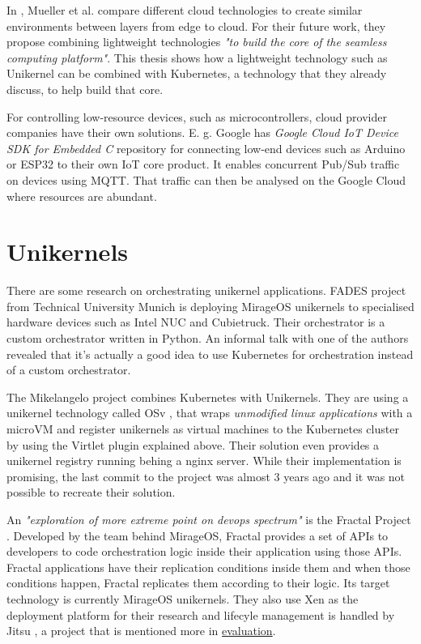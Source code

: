 In \cite{Mueller2017}, Mueller et al. compare different cloud technologies to create similar environments between layers from edge to cloud. For their future work, they propose combining lightweight technologies \textit{"to build the core of the seamless computing platform"}. This thesis shows how a lightweight technology such as Unikernel can be combined with Kubernetes, a technology that they already discuss, to help build that core.

For controlling low-resource devices, such as microcontrollers, cloud provider companies have their own solutions. E. g. Google has \textit{Google Cloud IoT Device SDK for Embedded C} repository for connecting low-end devices such as Arduino or ESP32 to their own IoT core product. It enables concurrent Pub/Sub traffic on devices using MQTT. That traffic can then be analysed on the Google Cloud where resources are abundant.

\section*{Unikernels}
There are some research on orchestrating unikernel applications. FADES project \cite{fades} from Technical University Munich is deploying MirageOS unikernels to specialised hardware devices such as Intel NUC and Cubietruck. Their orchestrator is a custom orchestrator written in Python. An informal talk with one of the authors revealed that it's actually a good idea to use Kubernetes for orchestration instead of a custom orchestrator.


The Mikelangelo project \cite{Struckmann2018} combines Kubernetes with Unikernels. They are using a unikernel technology called OSv \cite{osv}, that wraps \textit{unmodified linux applications} with a microVM and register unikernels as virtual machines to the Kubernetes cluster by using the Virtlet plugin explained above. Their solution even provides a unikernel registry running behing a nginx server. While their implementation is promising, the last commit to the project was almost 3 years ago and it was not possible to recreate their solution.

An \textit{"exploration of more extreme point on devops spectrum"} is the Fractal Project \cite{Koleini2019}. Developed by the team behind MirageOS, Fractal provides a set of APIs to developers to code orchestration logic inside their application using those APIs. Fractal applications have their replication conditions inside them and when those conditions happen, Fractal replicates them according to their logic. Its target technology is currently MirageOS unikernels. They also use Xen as the deployment platform for their research and lifecyle management is handled by Jitsu \cite{jitsu}, a project that is mentioned more in \hyperref[chapter:evaluation]{evaluation}.

